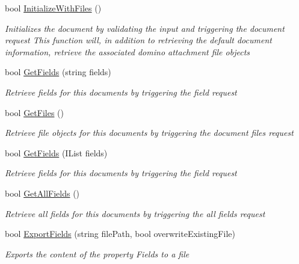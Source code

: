 \begin{DoxyCompactItemize}
bool \mbox{\hyperlink{class_document_object_a83f0e855adc5fb7afd02d2e34767f5c8}{Initialize\+With\+Files}} ()
\begin{DoxyCompactList}\small\item\em Initializes the document by validating the input and triggering the document request This function will, in addition to retrieving the default document information, retrieve the associated domino attachment file objects \end{DoxyCompactList}\item 
bool \mbox{\hyperlink{class_document_object_a8883fec3b5b1b6e2e43f4b5ca4092684}{Get\+Fields}} (string fields)
\begin{DoxyCompactList}\small\item\em Retrieve fields for this documents by triggering the field request \end{DoxyCompactList}\item 
bool \mbox{\hyperlink{class_document_object_a2c8aee9450e8fdd1e84e8ff26d0950a1}{Get\+Files}} ()
\begin{DoxyCompactList}\small\item\em Retrieve file objects for this documents by triggering the document files request \end{DoxyCompactList}\item 
bool \mbox{\hyperlink{class_document_object_a8e38704e02850b2480d29d184ae2c0e0}{Get\+Fields}} (I\+List fields)
\begin{DoxyCompactList}\small\item\em Retrieve fields for this documents by triggering the field request \end{DoxyCompactList}\item 
bool \mbox{\hyperlink{class_document_object_a5e070c7c0a45ac06422ee992c841e780}{Get\+All\+Fields}} ()
\begin{DoxyCompactList}\small\item\em Retrieve all fields for this documents by triggering the all fields request \end{DoxyCompactList}\item 
bool \mbox{\hyperlink{class_document_object_a1a763aa01710b370634f46c89b7d2d8e}{Export\+Fields}} (string file\+Path, bool overwrite\+Existing\+File)
\begin{DoxyCompactList}\small\item\em Exports the content of the property \textquotesingle{}Fields\textquotesingle{} to a file \end{DoxyCompactList}\item 

\end{DoxyCompactItemize}
